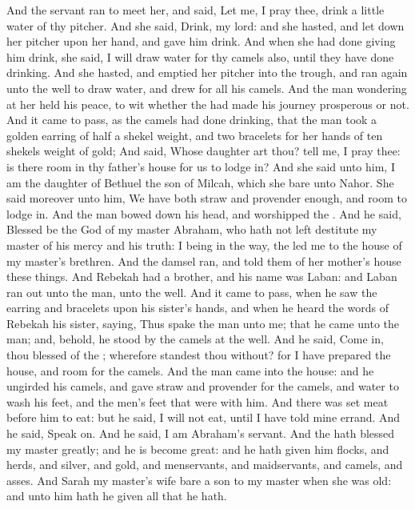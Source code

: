 \begin{biblechapter}
\verse And the servant ran to meet her, and said, Let me, I pray thee, drink a little water of thy pitcher.
\verse And she said, Drink, my lord: and she hasted, and let down her pitcher upon her hand, and gave him drink.
\verse And when she had done giving him drink, she said, I will draw water for thy camels also, until they have done drinking.
\verse And she hasted, and emptied her pitcher into the trough, and ran again unto the well to draw water, and drew for all his camels.
\verse And the man wondering at her held his peace, to wit whether the \LORD had made his journey prosperous or not.
\verse And it came to pass, as the camels had done drinking, that the man took a golden earring of half a shekel weight, and two bracelets for her hands of ten shekels weight of gold;
\verse And said, Whose daughter art thou? tell me, I pray thee: is there room in thy father's house for us to lodge in?
\verse And she said unto him, I am the daughter of Bethuel the son of Milcah, which she bare unto Nahor.
\verse She said moreover unto him, We have both straw and provender enough, and room to lodge in.
\verse And the man bowed down his head, and worshipped the \LORD.
\verse And he said, Blessed be the \LORD God of my master Abraham, who hath not left destitute my master of his mercy and his truth: I being in the way, the \LORD led me to the house of my master's brethren.
\verse And the damsel ran, and told them of her mother's house these things.
\verse And Rebekah had a brother, and his name was Laban: and Laban ran out unto the man, unto the well.
\verse And it came to pass, when he saw the earring and bracelets upon his sister's hands, and when he heard the words of Rebekah his sister, saying, Thus spake the man unto me; that he came unto the man; and, behold, he stood by the camels at the well.
\verse And he said, Come in, thou blessed of the \LORD; wherefore standest thou without? for I have prepared the house, and room for the camels.
\verse And the man came into the house: and he ungirded his camels, and gave straw and provender for the camels, and water to wash his feet, and the men's feet that were with him.
\verse And there was set meat before him to eat: but he said, I will not eat, until I have told mine errand. And he said, Speak on.
\verse And he said, I am Abraham's servant.
\verse And the \LORD hath blessed my master greatly; and he is become great: and he hath given him flocks, and herds, and silver, and gold, and menservants, and maidservants, and camels, and asses.
\verse And Sarah my master's wife bare a son to my master when she was old: and unto him hath he given all that he hath.

\end{biblechapter}
